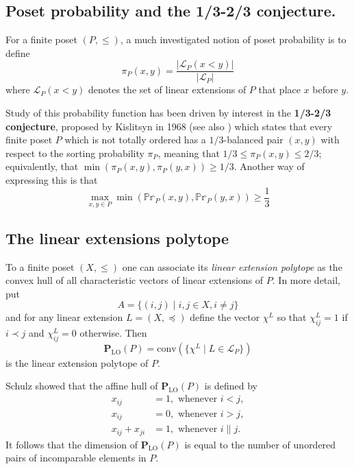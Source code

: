 \documentclass[11pt,a4paper,abstract=yes]{scrartcl}
\theoremstyle{plain}
\newcommand{\Prob}{\mathbb{Pr}}
\newcommand{\linexts}[1]{\mathcal{L}_{#1}}
\begin{document}
\subsection{Poset probability and the 1/3-2/3 conjecture.}
\label{sec:orgd28a5a6}
For a finite poset \((P,\le)\), a much investigated notion of poset probability
is to define
\begin{equation}
\label{eq-sortingprob}
  \pi_{P}(x,y) = \frac{|\linexts{P}(x < y)|}{|\linexts{P}|}
\end{equation}
where \(\linexts{P}(x < y)\) denotes the set of linear extensions of \(P\) that place \(x\) before \(y\).

Study of this probability function has been driven by interest in the
 \textbf{1/3-2/3 conjecture}, proposed by Kislitsyn \autocite{Kislitsyn13} in 1968
(see also \autocite{Fredman13}\autocite{Linial13}\autocite{Brightwell1999}\autocite{olson20181}) which states that
every finite poset \(P\) which is not totally ordered has a \(1/3\)-balanced pair
\((x,y)\) with respect to the sorting probability \(\pi_{P}\), meaning that
\(1/3 \le \pi_{P}(x,y) \le 2/3\); equivalently,
that \(\min(\pi_{P}(x,y), \pi_{P}(y,x)) \ge 1/3\).
Another way of expressing this is that
\begin{equation}
\label{eq-13maxmin}
  \max_{x,y \in P} \min (\Prob_{P}(x,y), \Prob_{P}(y,x))
  \ge \frac{1}{3}
\end{equation}
\subsection{The linear extensions polytope}
\label{sec:org7c0b6f8}
To a finite poset \((X,\le)\) one can associate its \emph{linear extension polytope}
\autocites{FacetsLinordpoly}[][]{FioriniLinextpolytope}
as the convex hull of all characteristic vectors of linear extensions of \(P\).
In more detail, put
\begin{equation}
\label{eq-linexA}
A = \{(i,j) \mid i,j \in X, i \neq j\}
\end{equation}
and for any linear extension \(L=(X,\preceq)\)  define the vector
\(\chi^{L}\) so that \(\chi_{{ij}}^{L}=1\) if \(i \prec j\) and \(\chi_{{ij}}^{L}=0\) otherwise.
Then
\[\mathbf{P}_{{\mathrm{LO}}}(P) = \mathrm{conv}(\{ \chi^{L} \mid L \in \linexts{P} \})\]
is the linear extension polytope of \(P\).

Schulz \autocite{SchulzPolytopes} showed that the affine hull of
\(\mathbf{P}_{{\mathrm{LO}}}(P)\) is defined by
\begin{align}
\label{eq-linex-eq}
  x_{ij} &= 1, \text{ whenever } i < j, \\
  x_{ij} &= 0, \text{ whenever } i > j, \\
  x_{ij} + x_{ji} &= 1, \text{ whenever } i \parallel j.
\end{align}
It follows that the dimension of \(\mathbf{P}_{{\mathrm{LO}}}(P)\) is equal to the number
of unordered pairs of incomparable elements in \(P\).
\end{document}
